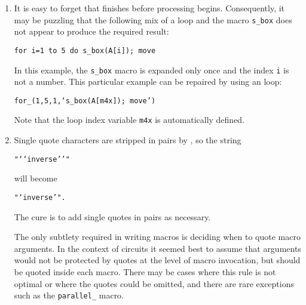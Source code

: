 \begin{enumerate}
{\tt source(up\_)}

\noindent draws a source up a distance equal to the current
{\tt lineht} value, which may cause confusion.
Writing

{\tt source(0.5)}

\noindent draws a source of length 0.5 units
in the current \pic default direction, which is one of
{\tt right,} {\tt left,} {\tt up,} or {\tt down.}
The best practice is
to specify both the direction and length of an element, thus:

{\tt source(up\_ elen\_).}

The effect of a \linespec argument is independent of any direction
set using the {\tt Point\_} or similar macros. 
To draw an element at an obtuse angle (see ) try,
for example,

{\tt Point\_(45); source(to rvec\_(0.5,0))}

\item 
{}
It is easy to forget that \Mfour finishes before \pic processing
begins. Consequently, it may be puzzling that the following mix of
a \pic loop and the \Mfour macro {\tt s\_box} does not appear to produce
the required result:

{\tt for i=1 to 5 do \lbr s\_box(A[i]); move \rbr}

\noindent In this example, the {\tt s\_box} macro is expanded only once
and the index {\tt i} is not a number.  This particular example can be
repaired by using an \Mfour loop:

{\tt for\_(1,5,1,`s\_box(A[m4x]); move')}

Note that the loop index variable {\tt m4x} is automatically defined.

\item 
{}
 Single quote characters are stripped in pairs by \Mfour, so the string

{\tt "{`}{`}inverse{'}{'}"}

\noindent will become

{\tt "{`}inverse{'}".}

\noindent The cure is to add single quotes in pairs as necessary.

  The only subtlety required in writing
  \Mfour macros is deciding when to quote macro arguments.  In the context
  of circuits it seemed best to assume that arguments would not
  be protected by quotes at the level of macro invocation, but should
  be quoted inside each macro.  There may be cases where this rule is
  not optimal or where the quotes could be omitted, and there are
  rare exceptions such as the {\tt parallel\_} macro.


\end{enumerate}
